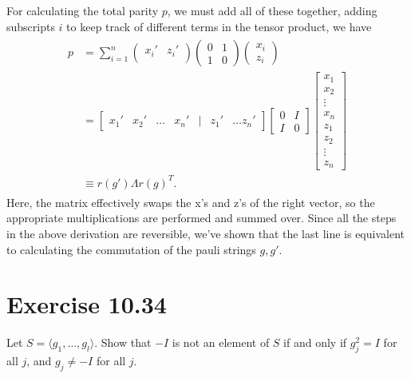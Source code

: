 \documentclass{book}
\begin{document}
    For calculating the total parity $p$, we must add all of these together, adding subscripts $i$ to keep track of different terms in the tensor product, we have
    \begin{align}
    \begin{aligned}
        p &= \sum_{i=1}^n \begin{pmatrix}
            x_i' & z_i' \\
        \end{pmatrix} \begin{pmatrix}
            0 & 1 \\
            1 & 0
        \end{pmatrix} \begin{pmatrix}
            x_i \\
            z_i
        \end{pmatrix} \\[1.5ex]
        &= \begin{bmatrix}
            x_1' & x_2' & \dots & x_n' & \vert & z_1' & \dots z_n'
        \end{bmatrix} \begin{bmatrix}
            0 & I \\
            I & 0
        \end{bmatrix} \begin{bmatrix}
            x_1 \\
            x_2 \\
            \vdots \\
            x_n \\
            z_1 \\
            z_2 \\
            \vdots \\
            z_n
        \end{bmatrix} \\
        &\equiv r(g') \Lambda r(g)^T. 
    \end{aligned}
    \end{align}
    Here, the matrix effectively swaps the x's and z's of the right vector, so the appropriate multiplications are performed and summed over. Since all the steps in the above derivation are reversible, we've shown that the last line is equivalent to calculating the commutation of the pauli strings $g, g'$.
    
\section*{Exercise 10.34}
    Let $S = \langle g_1,\dots,g_l\rangle$. Show that $-I$ is not an element of $S$ if and only if $g_j^2 =I$ for all $j$, and $g_j \neq -I$ for all $j$.
    
\end{document}
